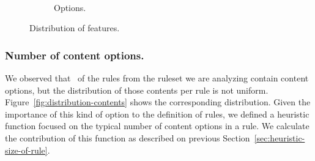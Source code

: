 \documentclass[sigconf,review, anonymous]{acmart}
\begin{document}
\begin{figure}[t!]
\begin{subfigure}{.25\textwidth}
\end{subfigure}%
\\
\begin{subfigure}{.2\textwidth}
  \centering
  \vspace{-5ex}      
  \caption{\label{fig:distribution-strings}Options.}
\end{subfigure}%
\vspace{-1ex}
\caption{Distribution of features.}
\end{figure}



\subsubsection{Number of content options.} We observed
that \percContentOptions\ of the rules from the ruleset we are
analyzing contain content options, but the distribution of those
contents per rule is not uniform. Figure~\ref{fig:distribution-contents} shows the
corresponding distribution. Given the importance of this kind of
option to the definition of rules, we defined a heuristic function
focused on the typical number of content options in a rule. We
calculate the contribution of this function as described on previous
Section~\ref{sec:heuristic-size-of-rule}. 

\end{document}
